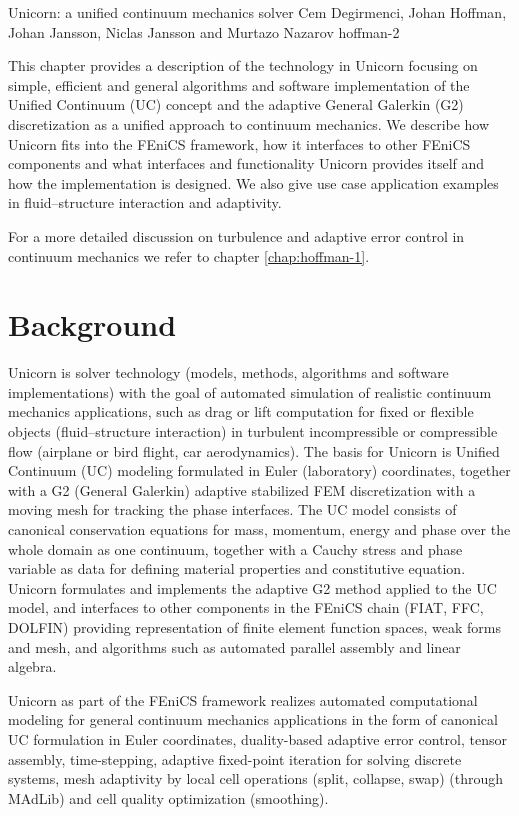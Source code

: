               {Unicorn: a unified continuum mechanics solver}
              {Cem Degirmenci, Johan Hoffman, Johan Jansson, Niclas Jansson and Murtazo Nazarov}
              {hoffman-2}

This chapter provides a description of the technology
in Unicorn focusing on simple, efficient and general
algorithms and software implementation of the Unified
Continuum (UC) concept and the adaptive General
Galerkin (G2) discretization as a unified approach to
continuum mechanics. We describe how Unicorn fits into
the FEniCS framework, how it interfaces to other
FEniCS components and what interfaces and
functionality Unicorn provides itself and how the
implementation is designed. We also give use case
application examples in fluid--structure interaction
and adaptivity.

For a more detailed discussion on turbulence and adaptive error
control in continuum mechanics we refer to
chapter \ref{chap:hoffman-1}.


\section{Background}

Unicorn is solver technology (models, methods, algorithms and software
implementations) with the goal of automated simulation of realistic
continuum mechanics applications, such as drag or lift computation for
fixed or flexible objects (fluid--structure interaction) in turbulent
incompressible or compressible flow (airplane or bird flight, car
aerodynamics). The basis for Unicorn is Unified Continuum (UC)
modeling formulated in Euler (laboratory) coordinates, together with a
G2 (General Galerkin) adaptive stabilized FEM discretization with a
moving mesh for tracking the phase interfaces. The UC model consists
of canonical conservation equations for mass, momentum, energy and
phase over the whole domain as one continuum, together with a Cauchy
stress and phase variable as data for defining material properties and
constitutive equation. Unicorn formulates and implements the adaptive
G2 method applied to the UC model, and interfaces to other components
in the FEniCS chain (FIAT, FFC, DOLFIN) providing representation of
finite element function spaces, weak forms and mesh, and algorithms
such as automated parallel assembly and linear algebra.

Unicorn as part of the FEniCS framework realizes automated
computational modeling for general continuum mechanics applications in
the form of canonical UC formulation in Euler coordinates,
duality-based adaptive error control, tensor assembly, time-stepping,
adaptive fixed-point iteration for solving discrete systems, mesh
adaptivity by local cell operations (split, collapse, swap) (through
MAdLib) and cell quality optimization (smoothing).

